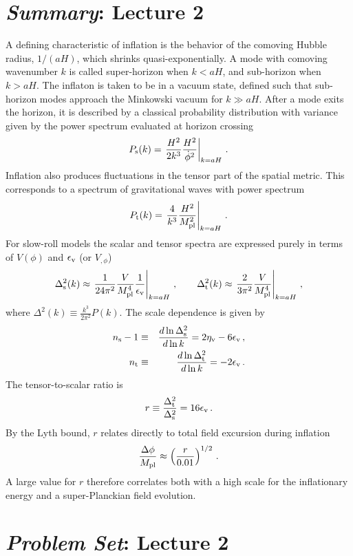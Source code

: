 \documentclass[12pt,letterpaper,rotate]{article}
\def\beq{\begin{equation}}
\def\eeq{\end{equation}}
\def\bea{\begin{eqnarray}}
\def\eea{\end{eqnarray}}
\def\Mp{M_{\rm pl}}
\begin{document}
{\newpage

\section{{\sl Summary}: Lecture 2}

\vskip 10pt
A defining characteristic of inflation is the behavior of the comoving Hubble radius, $1/(aH)$, which shrinks quasi-exponentially. A mode with comoving wavenumber $k$ is called super-horizon when $k<aH$, and sub-horizon when $k > aH$. The inflaton is taken to be in a vacuum state, defined such that sub-horizon modes approach the Minkowski vacuum for $k \gg aH$. After a mode exits the horizon, it is described by a classical probability distribution with variance given by the power spectrum evaluated at horizon crossing
\beq
P_{\rm s}(k) = \left. \frac{H^2}{2 k^3} \frac{H^2}{\dot \phi^2} \right|_{k=aH} \, .\nonumber
\eeq
Inflation also produces fluctuations in the tensor part of the spatial metric.
This corresponds to a spectrum of gravitational waves with power spectrum
\beq
P_{\rm t}(k) = \left. \frac{4}{k^3} \frac{H^2}{\Mp^2} \right|_{k=aH} \, .\nonumber
\eeq
For slow-roll models the scalar and tensor spectra are expressed purely in terms of $V(\phi)$ and $\epsilon_{\rm v}$ (or $V_{,\phi}$)
\beq
\Delta^2_{\rm s}(k) \approx \left. \frac{1}{24\pi^2}\frac{V}{\Mp^4}  \frac{1}{\epsilon_{\rm v}} \right|_{k=aH} \, ,
\qquad
\Delta^2_{\rm t}(k) \approx \left. \frac{2}{3\pi^2} \frac{V}{\Mp^4} \right|_{k=aH} \, , \nonumber
\eeq
where $\Delta^2(k) \equiv \frac{k^3}{2\pi^2} P(k)$.
The scale dependence is given by
\bea
n_{\rm s} - 1 &\equiv& \frac{d \ln \Delta^2_{\rm s}}{d \ln k}= 2 \eta_{\rm v} - 6 \epsilon_{\rm v} \, ,\nonumber \\
n_{\rm t}  &\equiv& \frac{d \ln \Delta^2_{\rm t}}{d \ln k}= - 2 \epsilon_{\rm v}\, . \nonumber
\eea
The tensor-to-scalar ratio is
\beq
r \equiv \frac{\Delta_{\rm t}^2}{\Delta_{\rm s}^2} = 16 \epsilon_{\rm v}\, . \nonumber
\eeq
By the
Lyth bound, $r$ relates directly to total field excursion during inflation
\beq
\frac{\Delta \phi}{\Mp} \approx \left( \frac{r}{0.01}\right)^{1/2} \nonumber \, .
\eeq
A large value for $r$ therefore correlates both with a high scale for the inflationary energy and a super-Planckian field evolution.

\newpage
\section{{\sl Problem Set}: Lecture 2}

}
\end{document}
